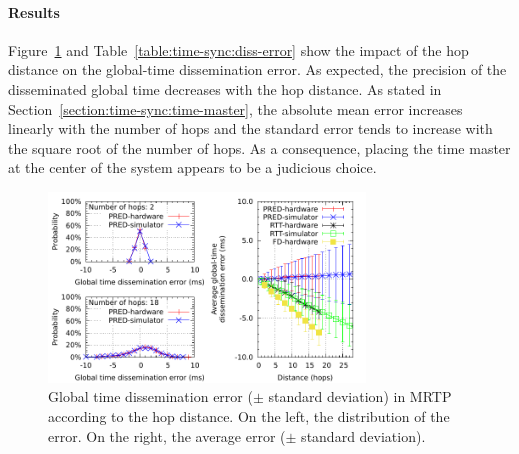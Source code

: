 \paragraph{Results}

Figure~\ref{fig:time-sync:dissemination-error} and Table~\ref{table:time-sync:diss-error} show the impact of the hop distance on the global-time dissemination error. As expected, the precision of the disseminated global time decreases with the hop distance. As stated in Section~\ref{section:time-sync:time-master}, the absolute mean error increases linearly with the number of hops and the standard error tends to increase with the square root of the number of hops. As a consequence, placing the time master at the center of the system appears to be a judicious choice.

\begin{figure}[!h]
	\begin{center}
		\includegraphics[width=0.75\textwidth]{images/time-synchronization/dissemination-error.pdf}
	\end{center}
	\caption{Global time dissemination error ($\pm$ standard deviation) in MRTP according to the hop distance. On the left, the distribution of the error. On the right, the average error ($\pm$ standard deviation).}
	\label{fig:time-sync:dissemination-error}
\end{figure}


